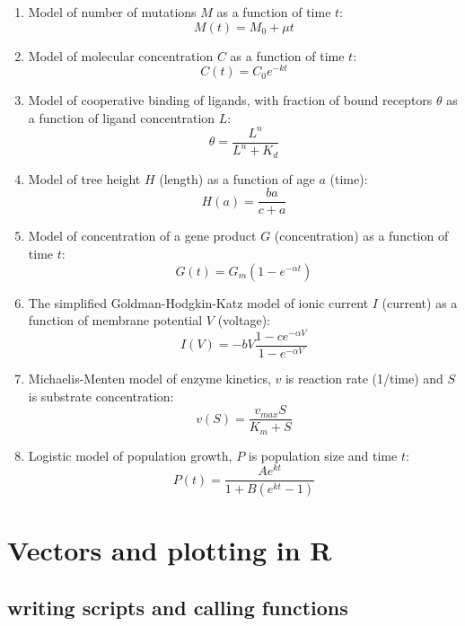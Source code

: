 \documentclass[
]{book}
\begin{document}
\begin{enumerate}
\def\labelenumi{\arabic{enumi}.}
\item
  Model of number of mutations \(M\) as a function of time \(t\):
  \[ M(t) = M_0 + \mu t\]
\item
  Model of molecular concentration \(C\) as a function of time \(t\):
  \[ C(t) = C_0 e^{-kt} \]
\item
  Model of cooperative binding of ligands, with fraction of bound receptors \(\theta\) as a function of ligand concentration \(L\):
  \[ \theta = \frac{L^n}{L^n + K_d}\]
\item
  Model of tree height \(H\) (length) as a function of age \(a\) (time):
  \[ H(a) = \frac{b a }{c + a}\]
\item
  Model of concentration of a gene product \(G\) (concentration) as a function of time \(t\):
  \[ G(t) = G_m (1 - e^{-\alpha t})\]
\item
  The simplified Goldman-Hodgkin-Katz model of ionic current \(I\) (current) as a function of membrane potential \(V\) (voltage):
  \[ I(V) = - b V \frac{1- c e^{-\alpha V}} {1-  e^{-\alpha V}} \]
\item
  Michaelis-Menten model  of enzyme kinetics, \(v\) is reaction rate (1/time) and \(S\) is substrate concentration:
  \[ v(S) = \frac{v_{max} S}{K_m + S}\]
\item
  Logistic model of population growth, \(P\) is population size and time \(t\):
  \[ P(t) = \frac{A e^{kt}}{1 + B(e^{kt} -1)} \]
\end{enumerate}

\hypertarget{vectors-and-plotting-in-r}{%
\section{Vectors and plotting in R}\label{vectors-and-plotting-in-r}}

\label{sec:comp2}

\hypertarget{writing-scripts-and-calling-functions}{%
\subsection{writing scripts and calling functions}\label{writing-scripts-and-calling-functions}}
\end{document}
